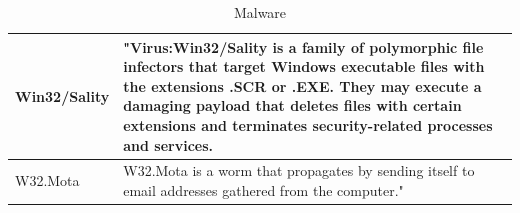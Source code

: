 \begin{center}
\begin{table}
\begin{tabular}{ l | p{13cm} }
Win32/Sality & "Virus:Win32/Sality is a family of polymorphic file infectors that target Windows executable files with the extensions .SCR or .EXE. They may execute a damaging payload that deletes files with certain extensions and terminates security-related processes and services.\\ \hline 
W32.Mota & W32.Mota is a worm that propagates by sending itself to email addresses gathered from the computer." \cite{mota}\\ \hline 
\end{tabular}
\caption{Malware}
\label{tab:malwarefamilies}
\end{table}
\end{center}

